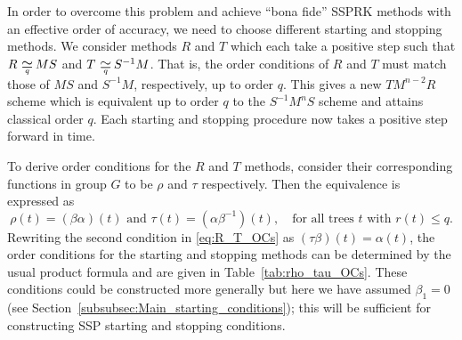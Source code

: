 \documentclass[final]{siamltex}  %
\begin{document}
In order to overcome this problem and achieve ``bona fide''
SSPRK methods with an effective order of accuracy, we need to choose different 
starting and stopping methods. 
We consider methods $R$ and $T$ which each take a positive step such that 
$R \equival{q} MS$ and $T \equival{q} S^{-1}M$.
That is, the order conditions of $R$ and $T$ must match those of
$MS$ and $S^{-1}M$, respectively, up to order $q$.
This gives a new $TM^{n-2}R$ scheme which is equivalent up to order $q$ 
to the $S^{-1}M^nS$ scheme and attains classical order $q$.
Each starting and stopping procedure now takes a positive step forward
in time.

To derive order conditions for the $R$ and $T$ methods, consider their
corresponding functions in group $G$ to be $\rho$ and $\tau$
respectively.
Then the equivalence is expressed as
\begin{equation} \label{eq:R_T_OCs}
    \rho(t) = (\beta\alpha)(t) \text{ and } \tau(t) = (\alpha\beta^{-1})(t), \quad \text{for all 
    trees $t$ with $r(t) \leq q$.}
\end{equation}
Rewriting the second condition in \eqref{eq:R_T_OCs} as 
$(\tau\beta)(t) = \alpha(t)$, the order conditions for the starting and stopping 
methods can be determined by the usual product formula and are given in Table~\ref{tab:rho_tau_OCs}.
These conditions could be constructed more generally but here we have
assumed $\beta_1=0$ (see Section~\ref{subsubsec:Main_starting_conditions}); this
will be sufficient for constructing SSP starting and stopping
conditions.
\end{document}
